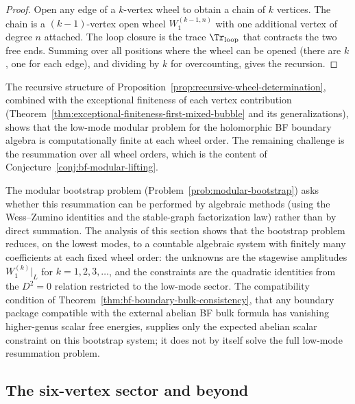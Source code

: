 \begin{proof}
Open any edge of a $k$-vertex wheel to obtain a chain of $k$ vertices. The chain is
a $(k-1)$-vertex open wheel $W_1^{(k-1,n)}$ with one additional vertex of degree $n$
attached. The loop closure is the trace $\Tr_{\mathrm{loop}}$ that contracts the two
free ends. Summing over all positions where the wheel can be opened (there are $k$,
one for each edge), and dividing by $k$ for overcounting, gives the recursion.
\end{proof}

\begin{remark}
The recursive structure of Proposition~\ref{prop:recursive-wheel-determination},
combined with the exceptional finiteness of each vertex contribution
(Theorem~\ref{thm:exceptional-finiteness-first-mixed-bubble} and its generalizations),
shows that the low-mode modular problem for the holomorphic BF boundary algebra is
computationally finite at each wheel order. The remaining challenge is the resummation
over all wheel orders, which is the content of Conjecture~\ref{conj:bf-modular-lifting}.

The modular bootstrap problem (Problem~\ref{prob:modular-bootstrap}) asks whether this
resummation can be performed by algebraic methods (using the Wess--Zumino identities
and the stable-graph factorization law) rather than by direct summation. The analysis
of this section shows that the bootstrap problem reduces, on the lowest modes, to a
countable algebraic system with finitely many coefficients at each fixed wheel order:
the unknowns are the stagewise amplitudes $W_1^{(k)}\big|_L$ for $k = 1, 2, 3, \ldots$,
and the constraints are the quadratic identities from the $D^2 = 0$ relation
restricted to the low-mode sector. The
compatibility condition of Theorem~\ref{thm:bf-boundary-bulk-consistency}, that any
boundary package compatible with the external abelian BF bulk formula has vanishing
higher-genus scalar free energies, supplies only the expected abelian scalar constraint on this
bootstrap system; it does not by itself solve the full low-mode resummation problem.
\end{remark}

\subsection{The six-vertex sector and beyond}

